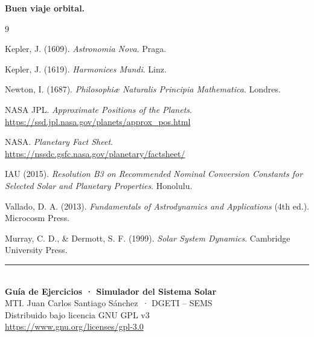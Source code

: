 \documentclass[11pt,a4paper]{article}
\newcommand{\autor}{MTI. Juan Carlos Santiago Sánchez}
\newcommand{\institucion}{DGETI -- SEMS}
\theoremstyle{definition}
\begin{document}
\textbf{Buen viaje orbital.}

\begin{thebibliography}{9}

Kepler, J. (1609). \emph{Astronomia Nova}. Praga.

Kepler, J. (1619). \emph{Harmonices Mundi}. Linz.

Newton, I. (1687). \emph{Philosophiæ Naturalis Principia Mathematica}. Londres.

NASA JPL. \emph{Approximate Positions of the Planets}.\\
\url{https://ssd.jpl.nasa.gov/planets/approx_pos.html}

NASA. \emph{Planetary Fact Sheet}.\\
\url{https://nssdc.gsfc.nasa.gov/planetary/factsheet/}

IAU (2015). \emph{Resolution B3 on Recommended Nominal Conversion Constants for Selected Solar and Planetary Properties}. Honolulu.

Vallado, D. A. (2013). \emph{Fundamentals of Astrodynamics and Applications} (4th ed.). Microcosm Press.

Murray, C. D., \& Dermott, S. F. (1999). \emph{Solar System Dynamics}. Cambridge University Press.

\end{thebibliography}

\vfill
\begin{center}
\rule{0.5\linewidth}{0.5pt}\\[0.3cm]
{\small\textbf{Guía de Ejercicios · Simulador del Sistema Solar}}\\[0.1cm]
{\footnotesize \autor\ · \institucion}\\[0.1cm]
{\footnotesize Distribuido bajo licencia GNU GPL v3}\\[0.1cm]
{\footnotesize \url{https://www.gnu.org/licenses/gpl-3.0}}
\end{center}
\end{document}

